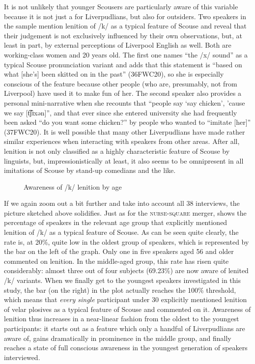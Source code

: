 It is not unlikely that younger Scousers are particularly aware of this variable because it is not just a  for Liverpudlians, but also for outsiders.
Two speakers in the sample mention lenition of /k/ as a typical feature of Scouse and reveal that their judgement is not exclusively influenced by their own observations, but, at least in part, by external perceptions of Liverpool English as well.
Both are working-class women and 20 years old.
The first one names ``the /x/ sound'' as a typical Scouse pronunciation variant and adds that this statement is ``based on what [she's] been skitted on in the past'' (36FWC20), so she is especially conscious of the feature because other people (who are, presumably, not from Liverpool) have used it to make fun of her.
The second speaker also provides a personal mini-narrative when she recounts that ``people say `say chicken', 'cause we say [t͡ʃɪxən]'', and that ever since she entered university she had frequently been asked ``do you want some chicken?'' by people who wanted to ``imitate [her]'' (37FWC20).
It is well possible that many other Liverpudlians have made rather similar experiences when interacting with speakers from other areas.
After all, lenition is not only classified as a highly characteristic feature of Scouse by linguists, but, impressionistically at least, it also seems to be omnipresent in all imitations of Scouse by stand-up comedians and the like.

\begin{figure}[h]
	\centering
		\resizebox{.49\linewidth}{!}{} 
	\caption{Awareness of /k/ lenition by age}
	\label{fig.aware.k}
\end{figure}

If we again zoom out a bit further and take into account all 38 interviews, the picture sketched above solidifies.
Just as for the \textsc{nurse}-\textsc{square} merger,  shows the percentage of speakers in the relevant age group that explicitly mentioned lenition of /k/ as a typical feature of Scouse.
As can be seen quite clearly, the rate is, at 20\%, quite low in the oldest group of speakers, which is represented by the bar on the left of the graph.
Only one in five speakers aged 56 and older commented on lenition.
In the middle-aged group, this rate has risen quite considerably: almost three out of four subjects (69.23\%) are now aware of lenited /k/ variants.
When we finally get to the youngest speakers investigated in this study, the bar (on the right) in the plot actually reaches the 100\% threshold, which means that \emph{every single} participant under 30 explicitly mentioned lenition of velar plosives as a typical feature of Scouse and commented on it.
Awareness of lenition thus increases in a near-linear fashion from the oldest to the youngest participants: it starts out as a feature which only a handful of Liverpudlians are aware of, gains dramatically in prominence in the middle group, and finally reaches a state of full conscious awareness in the youngest generation of speakers interviewed.

